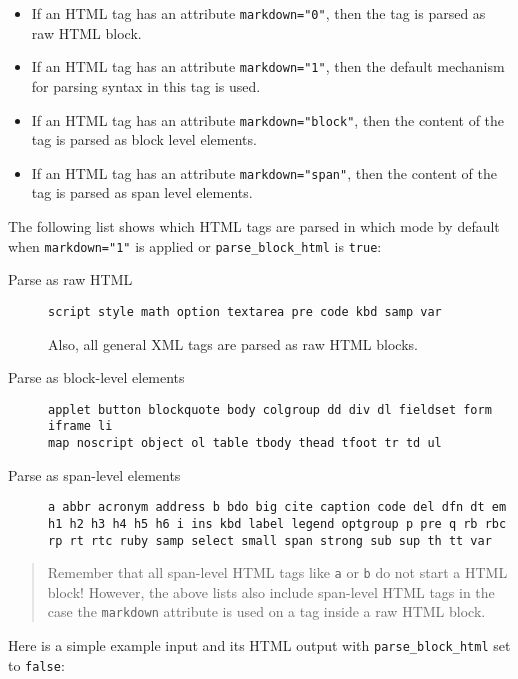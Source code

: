 \documentclass[a4paper]{article}
\begin{document}
\begin{itemize}
\item
  If an HTML tag has an attribute \texttt{markdown="0"}, then the tag is
  parsed as raw HTML block.
\item
  If an HTML tag has an attribute \texttt{markdown="1"}, then the
  default mechanism for parsing syntax in this tag is used.
\item
  If an HTML tag has an attribute \texttt{markdown="block"}, then the
  content of the tag is parsed as block level elements.
\item
  If an HTML tag has an attribute \texttt{markdown="span"}, then the
  content of the tag is parsed as span level elements.
\end{itemize}

The following list shows which HTML tags are parsed in which mode by
default when \texttt{markdown="1"} is applied or
\texttt{parse\_block\_html} is \texttt{true}:

\begin{description}
\item[Parse as raw HTML]
\begin{verbatim}
script style math option textarea pre code kbd samp var
\end{verbatim}

Also, all general XML tags are parsed as raw HTML blocks.
\item[Parse as block-level elements]
\begin{verbatim}
applet button blockquote body colgroup dd div dl fieldset form iframe li
map noscript object ol table tbody thead tfoot tr td ul
\end{verbatim}
\item[Parse as span-level elements]
\begin{verbatim}
a abbr acronym address b bdo big cite caption code del dfn dt em
h1 h2 h3 h4 h5 h6 i ins kbd label legend optgroup p pre q rb rbc
rp rt rtc ruby samp select small span strong sub sup th tt var
\end{verbatim}
\end{description}

\begin{quote}
Remember that all span-level HTML tags like \texttt{a} or \texttt{b} do
not start a HTML block! However, the above lists also include span-level
HTML tags in the case the \texttt{markdown} attribute is used on a tag
inside a raw HTML block.
\end{quote}

Here is a simple example input and its HTML output with
\texttt{parse\_block\_html} set to \texttt{false}:
\end{document}
